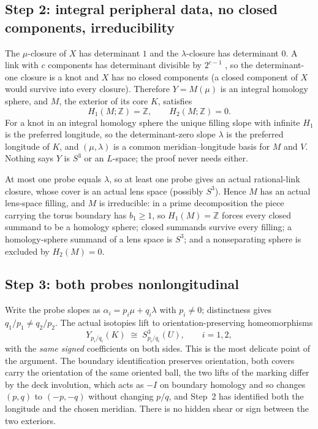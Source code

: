 \documentclass[11pt]{amsart}
\theoremstyle{remark}
\newcommand{\Z}{\mathbb{Z}}
\begin{document}
\subsection*{Step 2: integral peripheral data, no closed components, irreducibility}
The $\mu$-closure of $X$ has determinant $1$ and the $\lambda$-closure has determinant $0$. A link with $c$ components has determinant divisible by $2^{c-1}$ \cite[Prop.~6.5]{Stoimenow}, so the determinant-one closure is a knot and $X$ has no closed components (a closed component of $X$ would survive into every closure). Therefore $Y=M(\mu)$ is an integral homology sphere, and $M$, the exterior of its core $K$, satisfies
\[
H_1(M;\Z)=\Z,\qquad H_2(M;\Z)=0 .
\]
For a knot in an integral homology sphere the unique filling slope with infinite $H_1$ is the preferred longitude, so the determinant-zero slope $\lambda$ is the preferred longitude of $K$, and $(\mu,\lambda)$ is a common meridian--longitude basis for $M$ and $V$. Nothing says $Y$ is $S^3$ or an $L$-space; the proof never needs either.

At most one probe equals $\lambda$, so at least one probe gives an actual rational-link closure, whose cover is an actual lens space (possibly $S^3$). Hence $M$ has an actual lens-space filling, and $M$ is irreducible: in a prime decomposition the piece carrying the torus boundary has $b_1\ge 1$, so $H_1(M)=\Z$ forces every closed summand to be a homology sphere; closed summands survive every filling; a homology-sphere summand of a lens space is $S^3$; and a nonseparating sphere is excluded by $H_2(M)=0$.

\subsection*{Step 3: both probes nonlongitudinal}
Write the probe slopes as $\alpha_i=p_i\mu+q_i\lambda$ with $p_i\neq 0$; distinctness gives $q_1/p_1\neq q_2/p_2$. The actual isotopies lift to orientation-preserving homeomorphisms
\begin{equation}\label{eq:matched}
Y_{p_i/q_i}(K)\;\cong\; S^3_{p_i/q_i}(U),\qquad i=1,2,
\end{equation}
with the \emph{same signed} coefficients on both sides. This is the most delicate point of the argument. The boundary identification preserves orientation, both covers carry the orientation of the same oriented ball, the two lifts of the marking differ by the deck involution, which acts as $-I$ on boundary homology and so changes $(p,q)$ to $(-p,-q)$ without changing $p/q$, and Step~2 has identified both the longitude and the chosen meridian. There is no hidden shear or sign between the two exteriors.
\end{document}
